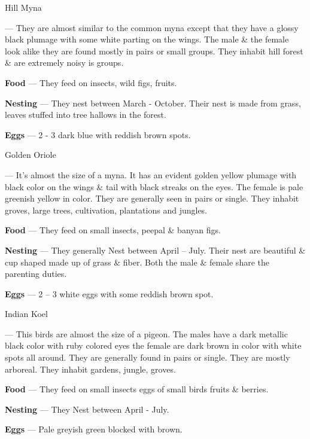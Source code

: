 \begin{bird}{Hill Myna}

 --- They are almost similar to the common myna except that they have a glossy black plumage with some white parting on the wings. The male \& the female look alike they are found mostly in pairs or small groups. They inhabit hill forest \& are extremely noisy is groups. 

{\large\bf Food} --- They feed on insects, wild figs, fruits.

{\large\bf Nesting} --- They nest between March - October. Their nest is made from grass, leaves stuffed into tree hallows in the forest.

{\large\bf Eggs} --- 2 - 3 dark blue with reddish brown spots.
\end{bird}

\begin{bird}{Golden Oriole}

 --- It's almost the size of a myna. It has an evident golden yellow plumage with black color on the wings \& tail with black streaks on the eyes. The female is pale greenish yellow in color. They are generally seen in pairs or single. They inhabit groves, large trees, cultivation, plantations and jungles.

{\large\bf Food} --- They feed on small insects, peepal \& banyan figs.

{\large\bf Nesting} --- They generally Nest between April -- July. Their nest are beautiful \& cup shaped made up of grass \& fiber. Both the male \& female share the parenting duties.

{\large\bf Eggs} --- 2 -- 3 white eggs with some reddish brown spot.
\end{bird}

\begin{bird}{Indian Koel}

 --- This birds are almost the size of a pigeon. The males have a dark metallic black color with ruby colored eyes the female are dark brown in color with white spots all around. They are generally found in pairs or single. They are mostly arboreal. They inhabit gardens, jungle, groves.

{\large\bf Food} --- They feed on small insects eggs of small birds fruits \& berries. 

{\bf Nesting} --- They Nest between April - July.

{\bf Eggs} --- Pale greyish green blocked with brown.
\end{bird}

